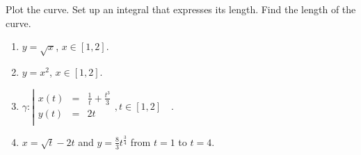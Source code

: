 Plot the curve. Set up an integral that expresses its length. Find the length of the curve. 
\begin{enumerate}
\item $y=\sqrt{x}$, $x\in [1, 2]$.
\item $y=x^2$, $x\in [1, 2]$.
\item 
$\gamma:\left| 
\begin{array}{rcl}
x(t)&=&\frac{1}{t}+\frac{t^3}{3}\\
y(t)&=&2t\\
\end{array}\right., t\in [1,2]\quad . $
\item \label{problemlengthx=sqrt(t)-2t,y=8/3t^(3/4)} $\displaystyle x = \sqrt{t} - 2t$ and $\displaystyle y = \frac{8}{3}t^{\frac{3}{4}}$ from $t = 1$ to $t = 4$.
\end{enumerate}
